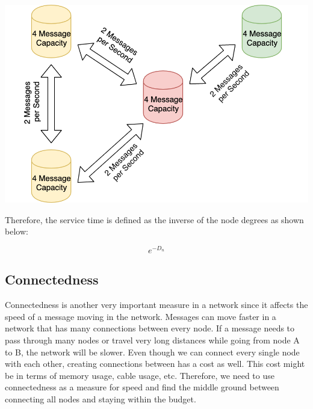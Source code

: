 \documentclass[journal]{IEEEtran}
\begin{document}
\begingroup
    \centering
    \bigskip
    \includegraphics[width=\columnwidth]{images/message_drop.png}
    \label{fig:message_drop_explained}
    \bigskip
\endgroup

\noindent Therefore, the service time is defined as the inverse of the node degrees as shown below:

\begin{equation}
    e^{-D_n}
    \label{eq:service_time_eq}
\end{equation}

\subsection{Connectedness}
\noindent Connectedness is another very important measure in a network since it affects the speed of a message moving in the network. Messages can move faster in a network that has many connections between every node. If a message needs to pass through many nodes or travel very long distances while going from node A to B, the network will be slower. Even though we can connect every single node with each other, creating connections between has a cost as well. This cost might be in terms of memory usage, cable usage, etc. Therefore, we need to use connectedness as a measure for speed and find the middle ground between connecting all nodes and staying within the budget. \\
\end{document}
